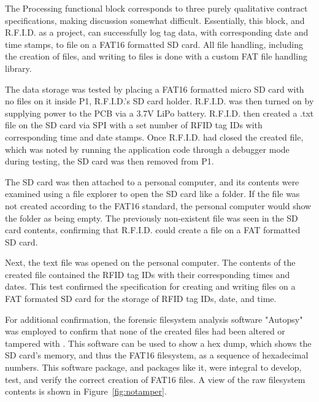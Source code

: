The Processing functional block corresponds to three purely qualitative contract specifications, making discussion somewhat difficult. Essentially, this block, and R.F.I.D. as a project, can successfully log tag data, with corresponding date and time stamps, to file on a FAT16 formatted SD card. All file handling, including the creation of files, and writing to files is done with a custom FAT file handling library.

The data storage was tested by placing a FAT16 formatted micro SD card with no files on it inside P1, R.F.I.D.'s SD card holder. R.F.I.D. was then turned on by supplying power to the PCB via a 3.7V LiPo battery. R.F.I.D. then created a .txt file on the SD card via SPI with a set number of RFID tag IDs with corresponding time and date stamps. Once R.F.I.D. had closed the created file, which was noted by running the application code through a debugger mode during testing, the SD card was then removed from P1.

The SD card was then attached to a personal computer, and its contents were examined using a file explorer to open the SD card like a folder. If the file was not created according to the FAT16 standard, the personal computer would show the folder as being empty. The previously non-existent file was seen in the SD card contents, confirming that R.F.I.D. could create a file on a FAT formatted SD card. 

Next, the text file was opened on the personal computer. The contents of the created file contained the RFID tag IDs with their corresponding times and dates. This test confirmed the specification for creating and writing files on a FAT formated SD card for the storage of RFID tag IDs, date, and time. 

For additional confirmation, the forensic filesystem analysis software "Autopsy" was employed to confirm that none of the created files had been altered or tampered with \cite{src_autopsy}. This software can be used to show a hex dump, which shows the SD card's memory, and thus the FAT16 filesystem, as a sequence of hexadecimal numbers. This software package, and packages like it, were integral to develop, test, and verify the correct creation of FAT16 files. A view of the raw filesystem contents is shown in Figure~\ref{fig:notamper}. 


